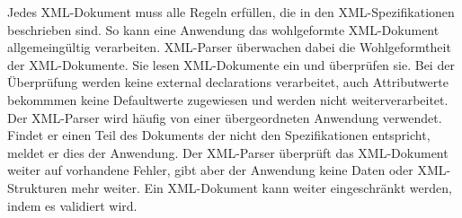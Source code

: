 Jedes XML-Dokument muss alle Regeln erfüllen, die in den XML-Spezifikationen beschrieben sind. So kann eine Anwendung das wohlgeformte XML-Dokument allgemeingültig verarbeiten. XML-Parser überwachen dabei die Wohlgeformtheit der XML-Dokumente. Sie lesen XML-Dokumente ein und überprüfen sie. Bei der Überprüfung werden keine external declarations verarbeitet, auch Attributwerte bekommmen keine Defaultwerte zugewiesen und werden nicht weiterverarbeitet. Der XML-Parser wird häufig von einer übergeordneten Anwendung verwendet. Findet er einen Teil des Dokuments der nicht den Spezifikationen entspricht, meldet er dies der Anwendung. Der XML-Parser überprüft das XML-Dokument weiter auf vorhandene Fehler, gibt aber der Anwendung keine Daten oder XML-Strukturen mehr weiter. Ein XML-Dokument kann weiter eingeschränkt werden, indem es validiert wird.





